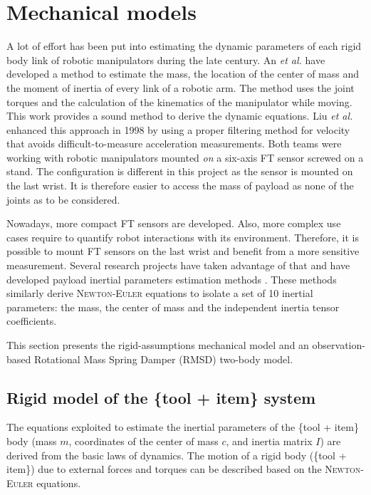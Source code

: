 \documentclass[/home/francois/latex/report/main.tex]{subfiles}
\begin{document}
\section{Mechanical models}
\label{section:mechanical-models}

A lot of effort has been put into estimating the dynamic parameters of each rigid body link of robotic manipulators during the late century. An \textit{et al.} \cite{An1985} have developed a method to estimate the mass, the location of the center of mass and the moment of inertia of every link of a robotic arm. The method uses the joint torques and the calculation of the kinematics of the manipulator while moving. This work provides a sound method to derive the dynamic equations. Liu \textit{et al.} enhanced this approach in 1998 \cite{Liu1998} by using a proper filtering method for velocity that avoids difficult-to-measure acceleration measurements. Both teams were working with robotic manipulators mounted \textit{on} a six-axis \ac{FT} sensor screwed on a stand. The configuration is different in this project as the sensor is mounted on the last wrist. It is therefore easier to access the mass of payload as none of the joints as to be considered.

Nowadays, more compact \ac{FT} sensors are developed. Also, more complex use cases require to quantify robot interactions with its environment. Therefore, it is possible to mount \ac{FT} sensors on the last wrist and benefit from a more sensitive measurement. Several research projects have taken advantage of that and have developed payload inertial parameters estimation methods \cite{Kubus2008, Kubus2007, Kubus2014, Farsoni2018}. These methods similarly derive \textsc{Newton-Euler} equations to isolate a set of 10 inertial parameters: the mass, the center of mass and the independent inertia tensor coefficients.

This section presents the rigid-assumptions mechanical model and an observation-based Rotational Mass Spring Damper (RMSD) two-body model.

\subsection{Rigid model of the \{tool + item\} system}
\label{section:background:rigid}

The equations exploited to estimate the inertial parameters of the \{tool + item\} body (mass $m$, coordinates of the center of mass $c$, and inertia matrix $I$) are derived from the basic laws of dynamics. The motion of a rigid body (\{tool + item\}) due to external forces and torques can be described based on the \textsc{Newton-Euler} equations.
\end{document}
